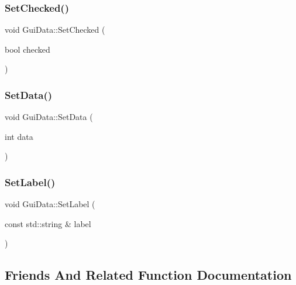 \mbox{\label{class_gui_data_a8e95e2fd1ffd33f993d02e8e24f7c000}} 
\subsubsection{\texorpdfstring{SetChecked()}{SetChecked()}}
{\footnotesize\ttfamily void Gui\+Data\+::\+Set\+Checked (\begin{DoxyParamCaption}\item[{bool}]{checked }\end{DoxyParamCaption})}

\mbox{\label{class_gui_data_a1d1537dd256a5ee90e55382b464e3aaf}} 
\subsubsection{\texorpdfstring{SetData()}{SetData()}}
{\footnotesize\ttfamily void Gui\+Data\+::\+Set\+Data (\begin{DoxyParamCaption}\item[{int}]{data }\end{DoxyParamCaption})}

\mbox{\label{class_gui_data_a18b0d69cc528e0a2eb58ac8813b3ad34}} 
\subsubsection{\texorpdfstring{SetLabel()}{SetLabel()}}
{\footnotesize\ttfamily void Gui\+Data\+::\+Set\+Label (\begin{DoxyParamCaption}\item[{const std\+::string \&}]{label }\end{DoxyParamCaption})}



\subsection{Friends And Related Function Documentation}
\mbox{\label{class_gui_data_ab7f63ac4717a09c5085d9be8d819a1a4}} 
